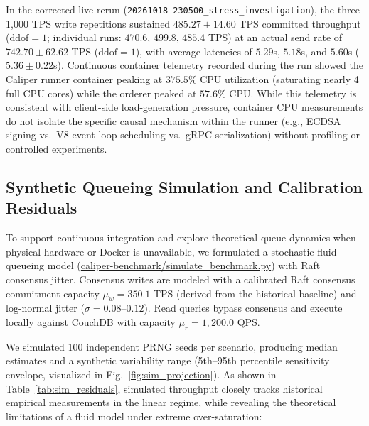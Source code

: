 \documentclass[runningheads]{llncs}
\begin{document}
In the corrected live rerun (\texttt{20261018-230500\_stress\_investigation}), the three 1,000 TPS write repetitions sustained $485.27 \pm 14.60$ TPS committed throughput ($\text{ddof}=1$; individual runs: $470.6$, $499.8$, $485.4$ TPS) at an actual send rate of $742.70 \pm 62.62$ TPS ($\text{ddof}=1$), with average latencies of $5.29$s, $5.18$s, and $5.60$s ($5.36 \pm 0.22$s). Continuous container telemetry recorded during the run showed the Caliper runner container peaking at $375.5\%$ CPU utilization (saturating nearly 4 full CPU cores) while the orderer peaked at $57.6\%$ CPU. While this telemetry is consistent with client-side load-generation pressure, container CPU measurements do not isolate the specific causal mechanism within the runner (e.g., ECDSA signing vs.\ V8 event loop scheduling vs.\ gRPC serialization) without profiling or controlled experiments.

\subsection{Synthetic Queueing Simulation and Calibration Residuals}
To support continuous integration and explore theoretical queue dynamics when physical hardware or Docker is unavailable, we formulated a stochastic fluid-queueing model (\url{caliper-benchmark/simulate_benchmark.py}) with Raft consensus jitter. Consensus writes are modeled with a calibrated Raft consensus commitment capacity $\mu_w = 350.1$ TPS (derived from the historical baseline) and log-normal jitter ($\sigma = 0.08$--$0.12$). Read queries bypass consensus and execute locally against CouchDB with capacity $\mu_r = 1,200.0$ QPS.

We simulated 100 independent PRNG seeds per scenario, producing median estimates and a synthetic variability range (5th--95th percentile sensitivity envelope, visualized in Fig.~\ref{fig:sim_projection}). As shown in Table~\ref{tab:sim_residuals}, simulated throughput closely tracks historical empirical measurements in the linear regime, while revealing the theoretical limitations of a fluid model under extreme over-saturation:
\end{document}
